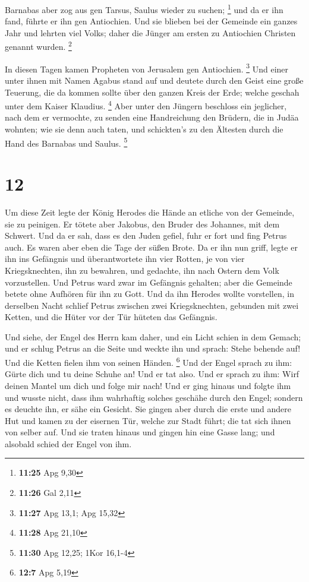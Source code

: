  Barnabas aber zog aus gen Tarsus, Saulus wieder zu suchen;
\footnote{\textbf{11:25} Apg 9,30}  und da er ihn fand,
führte er ihn gen Antiochien. Und sie blieben bei der Gemeinde ein
ganzes Jahr und lehrten viel Volks; daher die Jünger am ersten zu
Antiochien Christen genannt wurden. \footnote{\textbf{11:26} Gal 2,11}

 In diesen Tagen kamen Propheten von Jerusalem gen
Antiochien. \footnote{\textbf{11:27} Apg 13,1; Apg 15,32} 
Und einer unter ihnen mit Namen Agabus stand auf und deutete durch den
Geist eine große Teuerung, die da kommen sollte über den ganzen Kreis
der Erde; welche geschah unter dem Kaiser Klaudius. \footnote{\textbf{11:28}
  Apg 21,10}  Aber unter den Jüngern beschloss ein
jeglicher, nach dem er vermochte, zu senden eine Handreichung den
Brüdern, die in Judäa wohnten;  wie sie denn auch taten,
und schickten's zu den Ältesten durch die Hand des Barnabas und Saulus.
\footnote{\textbf{11:30} Apg 12,25; 1Kor 16,1-4}

\hypertarget{section-3}{%
\section{12}\label{section-3}}

 Um diese Zeit legte der König Herodes die Hände an etliche
von der Gemeinde, sie zu peinigen.  Er tötete aber Jakobus,
den Bruder des Johannes, mit dem Schwert.  Und da er sah,
dass es den Juden gefiel, fuhr er fort und fing Petrus auch. Es waren
aber eben die Tage der süßen Brote.  Da er ihn nun griff,
legte er ihn ins Gefängnis und überantwortete ihn vier Rotten, je von
vier Kriegsknechten, ihn zu bewahren, und gedachte, ihn nach Ostern dem
Volk vorzustellen.  Und Petrus ward zwar im Gefängnis
gehalten; aber die Gemeinde betete ohne Aufhören für ihn zu Gott.
 Und da ihn Herodes wollte vorstellen, in derselben Nacht
schlief Petrus zwischen zwei Kriegsknechten, gebunden mit zwei Ketten,
und die Hüter vor der Tür hüteten das Gefängnis.

 Und siehe, der Engel des Herrn kam daher, und ein Licht
schien in dem Gemach; und er schlug Petrus an die Seite und weckte ihn
und sprach: Stehe behende auf! Und die Ketten fielen ihm von seinen
Händen. \footnote{\textbf{12:7} Apg 5,19}  Und der Engel
sprach zu ihm: Gürte dich und tu deine Schuhe an! Und er tat also. Und
er sprach zu ihm: Wirf deinen Mantel um dich und folge mir nach!
 Und er ging hinaus und folgte ihm und wusste nicht, dass
ihm wahrhaftig solches geschähe durch den Engel; sondern es deuchte ihn,
er sähe ein Gesicht.  Sie gingen aber durch die erste und
andere Hut und kamen zu der eisernen Tür, welche zur Stadt führt; die
tat sich ihnen von selber auf. Und sie traten hinaus und gingen hin eine
Gasse lang; und alsobald schied der Engel von ihm.

